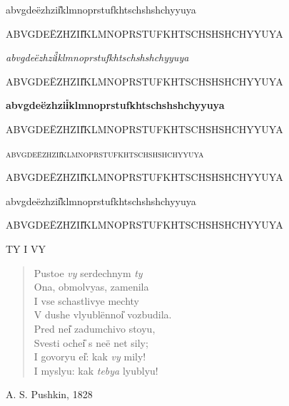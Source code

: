\documentclass[a4paper]{article}
\begin{document}
{\rmfamily
abvgde\"{e}zhzi\U{i}klmnoprstufkhtschshshch\hard y\soft \e yuya

ABVGDE\"{E}ZHZI\U{I}KLMNOPRSTUFKHTSCHSHSHCH\Hard Y\Soft \E YUYA}

\vspace{3ex}

{\itshape
abvgde\"{e}zhzi\U{i}klmnoprstufkhtschshshch\hard y\soft \e yuya

ABVGDE\"{E}ZHZI\U{I}KLMNOPRSTUFKHTSCHSHSHCH\Hard Y\Soft \E YUYA}

\vspace{3ex}

{\bfseries
abvgde\"{e}zhzi\U{i}klmnoprstufkhtschshshch\hard y\soft \e yuya

ABVGDE\"{E}ZHZI\U{I}KLMNOPRSTUFKHTSCHSHSHCH\Hard Y\Soft \E YUYA}

\vspace{3ex}

{\scshape
abvgde\"{e}zhzi\U{i}klmnoprstufkhtschshshch\hard y\soft \e yuya

ABVGDE\"{E}ZHZI\U{I}KLMNOPRSTUFKHTSCHSHSHCH\Hard Y\Soft \E YUYA}

\vspace{3ex}

{\sffamily
abvgde\"{e}zhzi\U{i}klmnoprstufkhtschshshch\hard y\soft \e yuya

ABVGDE\"{E}ZHZI\U{I}KLMNOPRSTUFKHTSCHSHSHCH\Hard Y\Soft \E YUYA}

\vspace{10ex}

{\large TY I VY}

\begin{verse}
	
	Pustoe \emph{vy} serdechnym \emph{ty} \\
	Ona, obmolvyas\soft, zamenila \\
	I vse schastlivye mechty \\
	V dushe vlyubl\"{e}nno\U{i} vozbudila. \\
	Pred ne\U{i} zadumchivo stoyu, \\
	Svesti oche\U{i} s ne\"{e} net sily; \\
	I govoryu e\U{i}: kak \emph{vy} mily! \\
	I myslyu: kak \emph{tebya} lyublyu! \\

\end{verse}

\begin{flushright}
	A. S. Pushkin, 1828
\end{flushright}
	
\end{document}
